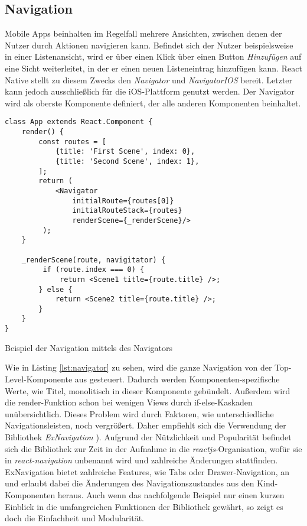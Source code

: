\subsection{Navigation}
Mobile Apps beinhalten im Regelfall mehrere Ansichten, zwischen denen der Nutzer durch Aktionen navigieren kann. Befindet sich der Nutzer beispielsweise in einer Listenansicht, wird er über einen Klick über einen Button \textit{Hinzufügen} auf eine Sicht weiterleitet, in der er einen neuen Listeneintrag hinzufügen kann. React Native stellt zu diesem Zwecks den \textit{Navigator} und \textit{NavigatorIOS} bereit. Letzter kann jedoch ausschließlich für die iOS-Plattform genutzt werden. Der Navigator wird als oberste Komponente definiert, der alle anderen Komponenten beinhaltet. 
\begin{listing}[H]
    \begin{verbatim}
class App extends React.Component {
    render() {
        const routes = [
            {title: 'First Scene', index: 0},
            {title: 'Second Scene', index: 1},
        ];
        return (
            <Navigator
                initialRoute={routes[0]}
                initialRouteStack={routes}
                renderScene={_renderScene}/>
         );
    }
    
    _renderScene(route, navigitator) {
         if (route.index === 0) {
             return <Scene1 title={route.title} />;
        } else {
            return <Scene2 title={route.title} />;
        }
    }
}
    \end{verbatim}
    \caption{Beispiel der Navigation mittels des Navigators}
    \label{lst:navigator}
\end{listing}

Wie in Listing \ref{lst:navigator} zu sehen, wird die ganze Navigation von der Top-Level-Komponente aus gesteuert. Dadurch werden Komponenten-spezifische Werte, wie Titel, monolitisch in dieser Komponente gebündelt. Außerdem wird die render-Funktion schon bei wenigen Views durch if-else-Kaskaden unübersichtlich. Dieses Problem wird durch Faktoren, wie unterschiedliche Navigationsleisten, noch vergrößert. Daher empfiehlt sich die Verwendung der Bibliothek \textit{ExNavigation} \cite{exNavigation_2016}). Aufgrund der Nützlichkeit und Popularität befindet sich die Bibliothek zur Zeit in der Aufnahme in die \textit{reactjs}-Organisation, wofür sie in \textit{react-navigation} unbenannt wird und zahlreiche Änderungen stattfinden. ExNavigation bietet zahlreiche Features, wie Tabs oder Drawer-Navigation, an und erlaubt dabei die Änderungen des Navigationszustandes aus den Kind-Komponenten heraus. Auch wenn das nachfolgende Beispiel nur einen kurzen Einblick in die umfangreichen Funktionen der Bibliothek gewährt, so zeigt es doch die Einfachheit und Modularität.

